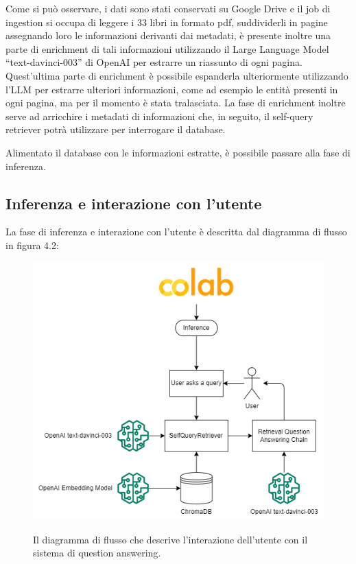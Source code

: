 Come si può osservare, i dati sono stati conservati su Google Drive e il job di ingestion si occupa di leggere i 33 libri in formato pdf,
suddividerli in pagine assegnando loro le informazioni derivanti dai metadati, è presente inoltre una parte di enrichment di tali informazioni 
utilizzando il Large Language Model ``text-davinci-003'' di OpenAI per estrarre un riassunto di ogni pagina. Quest'ultima parte di enrichment è possibile espanderla ulteriormente
utilizzando l'LLM per estrarre ulteriori informazioni, come ad esempio le entità presenti in ogni pagina, ma per il momento è stata tralasciata.
La fase di enrichment inoltre serve ad arricchire i metadati di informazioni che, in seguito, il self-query retriever potrà utilizzare per interrogare il database.

Alimentato il database con le informazioni estratte, è possibile passare alla fase di inferenza.

\subsection[Inferenza]{Inferenza e interazione con l'utente}

La fase di inferenza e interazione con l'utente è descritta dal diagramma di flusso in figura 4.2:

\begin{figure}[H]
    \centering
    \includegraphics[height=0.3\pdfpageheight]{images/Inference.png}\label{fig:infer}
    \caption[Ingestion]{Il diagramma di flusso che descrive l'interazione dell'utente con il sistema di question answering.}
\end{figure}

